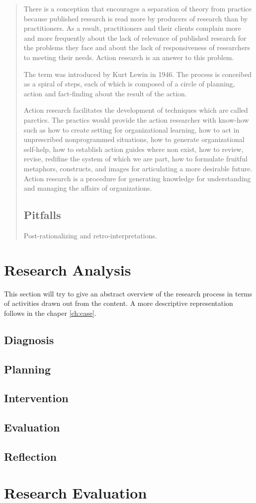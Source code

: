 \begin{quotation}
There is a conception that encourages a separation of theory from practice because published research is read more by producers of research than by practitioners. As a result, practitioners and their clients complain more and more frequently about the lack of relevance of published research for the problems they face and about the lack of responsiveness of researchers to meeting their needs.
Action research is an answer to this problem. 


The term was introduced by Kurt Lewin in 1946. The process is conceibed as a spiral of steps, each of which is composed of a circle of planning, action and fact-finding about the result of the action.

Action research facilitates the development of techniques which are called parctics. 
The practics would provide the action researcher with know-how such as how to create setting for organizational learning, how to act in unprescribed nonprogrammed situations, how to generate organizational self-help, how to establish action guides where non exist, how to review, revise, redifine the system of which we are part, how to formulate fruitful metaphors, constructs, and images for articulating a more desirable future. 
Action research is a procedure for generating knowledge for understanding and managing the affairs of organizations.
\subsection{Pitfalls}
Post-rationalizing and retro-interpretations.
\\
\end{quotation}
\cite{car:rmn}
\cite{bjo:risc}
\cite{assess:susman}

\section{Research Analysis}
This section will try to give an abstract overview of the research process in terms of activities drawn out from the content. 
A more descriptive representation follows in the chaper \ref{ch:case}.  
\subsection{Diagnosis}

\subsection{Planning}

\subsection{Intervention}

\subsection{Evaluation}

\subsection{Reflection}

\section{Research Evaluation}
